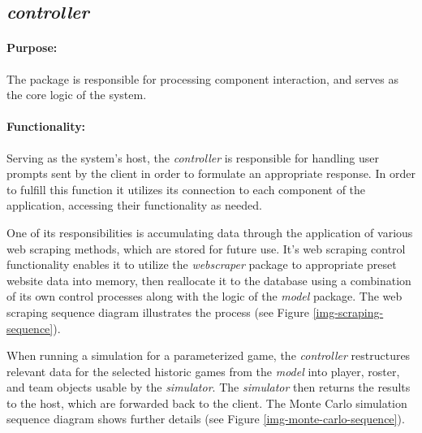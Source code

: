 \documentclass{thesis-ekf}
\theoremstyle{definition}
\theoremstyle{remark}
\begin{document}
\subsection{\emph{controller}}
\paragraph{Purpose:}
The package is responsible for processing component interaction, and serves as the core logic of the system.
\paragraph{Functionality:}
Serving as the system's host, the \emph{controller} is responsible for handling user prompts sent by the client in order to formulate an appropriate response. In order to fulfill this function it utilizes its connection to each component of the application, accessing their functionality as needed.

One of its responsibilities is accumulating data through the application of various web scraping methods, which are stored for future use. It's web scraping control functionality enables it to utilize the \emph{webscraper} package to appropriate preset website data into memory, then reallocate it to the database using a combination of its own control processes along with the logic of the \emph{model} package. The web scraping sequence diagram illustrates the process (see Figure {\ref{img-scraping-sequence}}).

When running a simulation for a parameterized game, the \emph{controller} restructures relevant data for the selected historic games from the \emph{model} into player, roster, and team objects usable by the \emph{simulator}. The \emph{simulator} then returns the results to the host, which are forwarded back to the client. The Monte Carlo simulation sequence diagram shows further details (see Figure {\ref{img-monte-carlo-sequence}}).
\end{document}
